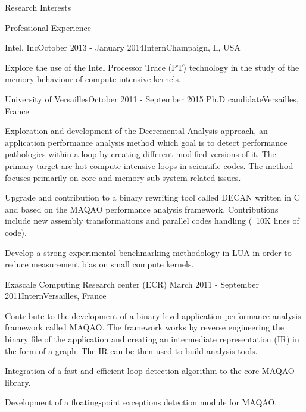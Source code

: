 \documentclass{resume} %
\begin{document}
\begin{rSection}{Research Interests}
\begin{rSection}{Professional Experience}
\begin{rSubsection}{Intel, Inc}{October 2013 - January 2014}{Intern}{Champaign, Il, USA}
\item Explore the use of the Intel Processor Trace (PT) technology in the 
      study of the memory behaviour of compute intensive kernels.
\end{rSubsection}


\begin{rSubsection}{University of Versailles}{October 2011 - September 2015}
                   {Ph.D candidate}{Versailles, France}
\item Exploration and development of the Decremental Analysis approach, 
      an application performance analysis method which goal is to detect performance 
      pathologies within a loop by creating different modified versions
      of it. The primary target are hot compute intensive loops in scientific codes. 
      The method focuses primarily on core and memory sub-system related issues.
\item Upgrade and contribution to a binary rewriting tool called DECAN written in C
      and based on the MAQAO performance analysis framework. Contributions include
      new assembly transformations and parallel codes handling (~10K lines of code).   
\item Develop a strong experimental benchmarking methodology in LUA in order to 
      reduce measurement bias on small compute kernels. 
\end{rSubsection}

\newpage
\begin{rSubsection}{Exascale Computing Research center (ECR)}
                   {March 2011 - September 2011}{Intern}{Versailles, France}
\item Contribute to the development of a binary level application performance 
      analysis framework called MAQAO. The framework works by reverse engineering 
      the binary file of the application and creating an intermediate representation 
      (IR) in the form of a graph. The IR can be then used to build analysis tools.  
\item Integration of a fast and efficient loop detection algorithm to the core 
      MAQAO library.
\item Development of a floating-point exceptions detection module for MAQAO.
\end{rSubsection}



\end{rSection}
\end{rSection}
\end{document}

